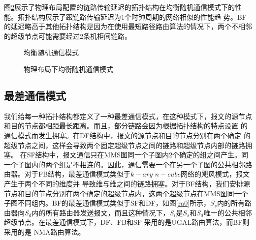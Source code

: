 图\ref{layoutun}展示了物理布局配置的链路传输延迟的拓扑结构在均衡随机通信模式下的性能。拓扑结构展示了跟链路传输延迟为1个时钟周期的网络相似的性能趋
势。BF的延迟略高于其他拓扑结构是因为在使用最短路径路由算法的情况下，两个不相邻的超级节点可能需要经过2条机柜间链路。


\begin{figure}[t]
  \centering
 \begin{minipage}[t]{\textwidth}
   \centering
  \vspace{-.3cm}
  \caption{均衡随机通信模式}
  \label{l1un}
  \end{minipage}
\end{figure}

\begin{figure}[t]
\setlength{\belowcaptionskip}{-.3cm}%
  \centering
 \begin{minipage}[t]{\textwidth}
   \centering
  \vspace{-.3cm}
  \caption{物理布局下均衡随机通信模式}
  \label{layoutun}
  \end{minipage}
  \end{figure}

  \subsection{最差通信模式}

  我们给每一种拓扑结构都定义了一种最差通信模式，在这种模式下，报文的源节点和目的节点都相距最长距离。而且，部分链路会因为根据拓扑结构的特点设置
  的通信模式而发生拥塞。在DF结构中，报文的源节点和目的节点分别在两个确定
  的超级节点之间，这样会导致两个固定超级节点之间的链路和超级节点内部的链路拥塞。 在SF结构中，报文通信只在MMS图同一个子图内2个确定的组之间产生。同一个子图内的两个组是不相连的。因此，通信需要一个在另一个子图的公共相邻路由器。对于FB结构，最差通信模式类似于$k-ary$ $n-cube$网络的飓风模式，报文产生于两个不同的维度并
  导致维与维之间的链路拥塞。对于BF结构，我们安排源节点和目的节点分别在两个确定的超级节点内，这两个超级节点在MMS图同一个子图不同组内。BF的最差通信模式类似于SF和DF，如图\ref{ra0}所示，$S_s$内的所有路由器向$S_d$内的所有路由器发送报文，而且这种情况下，$S_i$是$S_s$和$S_d$唯一的公共相邻超级节点。在最差通信模式下，DF、FB和SF 采用的是UGAL路由算法，而BF则采用的是
  NMA路由算法。

